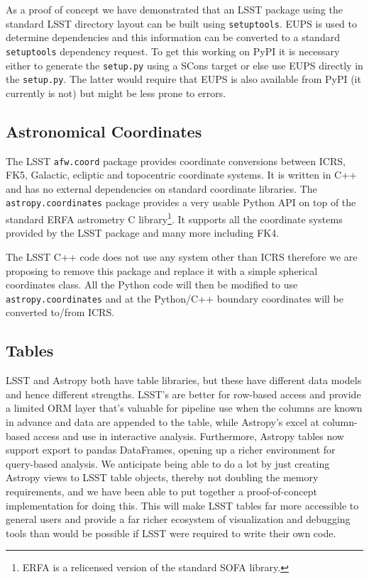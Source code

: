 \documentclass[]{spie}  %
\begin{document}
As a proof of concept we have demonstrated that an LSST package using the standard LSST directory layout can be built using \texttt{setuptools}.
EUPS is used to determine dependencies and this information can be converted to a standard \texttt{setuptools} dependency request.
To get this working on PyPI it is necessary either to generate the \texttt{setup.py} using a SCons target or else use EUPS directly in the \texttt{setup.py}.
The latter would require that EUPS is also available from PyPI (it currently is not) but might be less prone to errors.

\subsection{Astronomical Coordinates}

The LSST \texttt{afw.coord} package provides coordinate conversions between ICRS, FK5, Galactic, ecliptic and topocentric coordinate systems.
It is written in C++ and has no external dependencies on standard coordinate libraries.
The \texttt{astropy.coordinates} package provides a very usable Python API on top of the standard ERFA astrometry C library\footnote{ERFA is a relicensed version of the standard SOFA library\cite{2011SchpJ...611404H}.}.
It supports all the coordinate systems provided by the LSST package and many more including FK4.

The LSST C++ code does not use any system other than ICRS therefore we are proposing to remove this package and replace it with a simple spherical coordinates class.
All the Python code will then be modified to use \texttt{astropy.coordinates} and at the Python/C++ boundary coordinates will be converted to/from ICRS.

\subsection{Tables}

LSST and Astropy both have table libraries, but these have different data models and hence different strengths.
LSST's are better for row-based access and provide a limited ORM layer that's valuable for pipeline use when the columns are known in advance and data are appended to the table, while Astropy's excel at column-based access and use in interactive analysis.
Furthermore, Astropy tables now support export to pandas DataFrames\cite{mckinney-proc-scipy-2010}, opening up a richer environment for query-based analysis.
We anticipate being able to do a lot by just creating Astropy views to LSST table objects, thereby not doubling the memory requirements, and we have been able to put together a proof-of-concept implementation for doing this.
This will make LSST tables far more accessible to general users and provide a far richer ecosystem of visualization and debugging tools than would be possible if LSST were required to write their own code.
\end{document}
